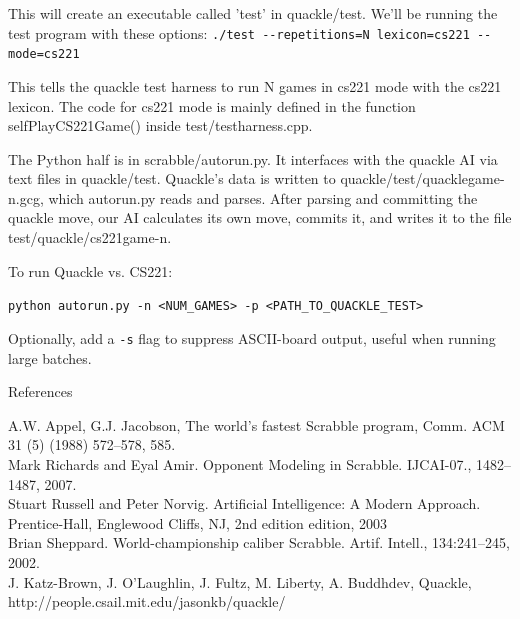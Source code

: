 \documentclass[12pt]{article}
\begin{document}
This will create an executable called 'test' in quackle/test. We'll be
running the test program with these options:
\verb|./test --repetitions=N lexicon=cs221 --mode=cs221|

This tells the quackle test harness to run N games in cs221 mode with
the cs221 lexicon. The code for cs221 mode is mainly defined in the
function selfPlayCS221Game() inside test/testharness.cpp.

The Python half is in scrabble/autorun.py. It interfaces with the
quackle AI via text files in quackle/test. Quackle's data is written
to quackle/test/quacklegame-n.gcg, which autorun.py reads and
parses. After parsing and committing the quackle move, our AI
calculates its own move, commits it, and writes it to the file
test/quackle/cs221game-n.

To run Quackle vs. CS221:

\verb|python autorun.py -n <NUM_GAMES> -p <PATH_TO_QUACKLE_TEST>|

Optionally, add a \texttt{-s} flag to suppress ASCII-board output,
useful when running large batches.

\vspace{ 8cm }
\clearpage
\begin{center}
{\Large References}
\end{center} 
A.W. Appel, G.J. Jacobson, The world’s fastest Scrabble program, Comm. ACM 31 (5) (1988) 572–578, 585. \\
Mark Richards and Eyal Amir. Opponent Modeling in Scrabble. IJCAI-07., 1482–1487, 2007. \\
Stuart Russell and Peter Norvig. Artificial Intelligence: A Modern Approach. Prentice-Hall,
Englewood Cliffs, NJ, 2nd edition edition, 2003 \\
Brian Sheppard. World-championship caliber Scrabble. Artif. Intell., 134:241–245, 2002. \\
J. Katz-Brown, J. O'Laughlin, J. Fultz, M. Liberty, A. Buddhdev, Quackle,\\ http://people.csail.mit.edu/jasonkb/quackle/
\end{document}
